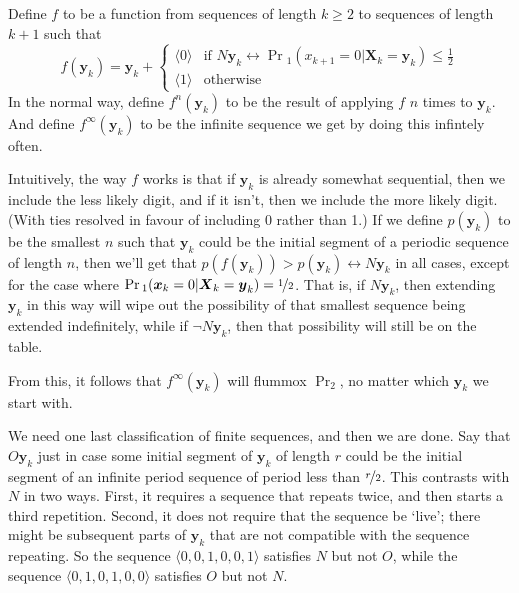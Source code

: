 \documentclass{ergoclass}
\newcommand{\vx}{\boldsymbol{x}}
\newcommand{\vX}{\boldsymbol{X}}
\newcommand{\vy}{\boldsymbol{y}}
\begin{document}
%
\noindent Define $f$ to be a function from sequences of length $k \geq 2$ to sequences of length $k+1$ such that 
\begin{equation*}
f(\vy_k) = \vy_k + 
	\begin{cases} 
		\langle 0 \rangle &\text{if } N\vy_k \leftrightarrow \Pr{}_1(x_{k+1} = 0 | \vX_k = \vy_k) \leq \frac{1}{2} \\
		\langle 1 \rangle &\text{otherwise}
	\end{cases}
\end{equation*}
%
%
%
In the normal way, define $f^n(\vy_k)$ to be the result of applying $f$ $n$ times to $\vy_k$. And define $f^\infty(\vy_k)$ to be the infinite sequence we get by doing this infintely often.

Intuitively, the way $f$ works is that if $\vy_k$ is already somewhat sequential, then we include the less likely digit, and if it isn't, then we include the more likely digit. (With ties resolved in favour of including 0 rather than 1.) If we define $p(\vy_k)$ to be the smallest $n$ such that $\vy_k$ could be the initial segment of a periodic sequence of length $n$, then we'll get that $p(f(\vy_k)) > p(\vy_k) \leftrightarrow N\vy_k$ in all cases, except for the case where $\Pr{}_1(\vx_k = 0 | \vX_k = \vy_k) = \nicefrac{1}{2}$. That is, if $N\vy_k$, then extending $\vy_k$ in this way will wipe out the possibility of that smallest sequence being extended indefinitely, while if $\neg N\vy_k$, then that possibility will still be on the table. 

From this, it follows that $f^{\infty}(\vy_k)$ will flummox $\Pr_2$, no matter which $\vy_k$ we start with.

We need one last classification of finite sequences, and then we are done. Say that $O\vy_k$ just in case some initial segment of $\vy_k$ of length $r$ could be the initial segment of an infinite period sequence of period less than $\nicefrac{r}{2}$. This contrasts with $N$ in two ways. First, it requires a sequence that repeats twice, and then starts a third repetition. Second, it does not require that the sequence be `live'; there might be subsequent parts of $\vy_k$ that are not compatible with the sequence repeating. So the sequence $\langle 0, 0, 1, 0, 0, 1\rangle$ satisfies $N$ but not $O$, while the sequence $\langle 0, 1, 0, 1, 0, 0\rangle$ satisfies $O$ but not $N$.
\end{document}
